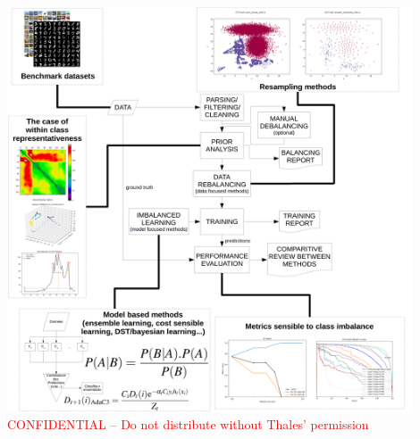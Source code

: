 \documentclass[24pt, a0paper, portrait]{tikzposter}
\begin{document}
{
\block{}
{\centering
\includegraphics[width=0.9\textwidth]{schema}\\
\vspace{2em}
\textcolor{red}{{\fontsize{60pt}{60pt}\selectfont CONFIDENTIAL -- Do not distribute without Thales' permission}}
}
}
 
\end{document}
